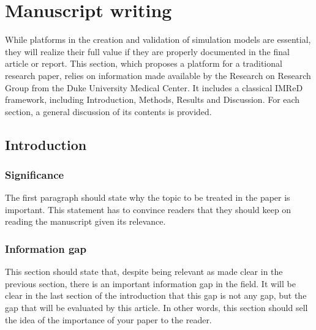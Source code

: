 \documentclass[11pt]{article}
\begin{document}

\section {Manuscript writing}

While platforms in the creation and validation of simulation models are essential, they will realize their full value if they are properly documented in the final article or report.  This section, which proposes a platform for a traditional research paper, relies on information made available by the Research on Research Group \cite{researchonresearch14} from the Duke University Medical Center.  It includes a classical IMReD framework, including Introduction, Methods, Results and Discussion.  For each section, a general discussion of its contents is provided.

\subsection {Introduction}

\subsubsection {Significance}
The first paragraph should state why the topic to be treated in the paper is important. This statement has to convince readers that they should keep on reading the manuscript given its relevance.

\subsubsection {Information gap}
This section should state that, despite being relevant as made clear in the previous section, there is an important information gap in the field. It will be clear in the last section of the introduction that this gap is not any gap, but the gap that will be evaluated by this article. In other words, this section should sell the idea of the importance of your paper to the reader.
\end{document}
